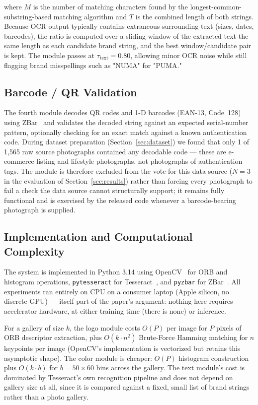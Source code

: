 \documentclass[conference]{IEEEtran}
\begin{document}
where $M$ is the number of matching characters found by the
longest-common-substring-based matching algorithm and $T$ is the combined
length of both strings. Because OCR output typically contains extraneous
surrounding text (sizes, dates, barcodes), the ratio is computed over a
sliding window of the extracted text the same length as each candidate
brand string, and the best window/candidate pair is kept. The module
passes at $\tau_{\text{text}} = 0.80$, allowing minor OCR noise while
still flagging brand misspellings such as "NUMA" for "PUMA."

\subsection{Barcode / QR Validation}
\label{sec:qr}

The fourth module decodes QR codes and 1-D barcodes (EAN-13, Code~128)
using ZBar~\cite{zbar} and validates the decoded string against an
expected serial-number pattern, optionally checking for an exact match
against a known authentication code. During dataset preparation
(Section~\ref{sec:dataset}) we found that only 1 of 1{,}565 raw source
photographs contained any decodable code --- these are e-commerce listing
and lifestyle photographs, not photographs of authentication tags. The
module is therefore excluded from the vote for this data source
($N{=}3$ in the evaluation of Section~\ref{sec:results}) rather than
forcing every photograph to fail a check the data source cannot
structurally support; it remains fully functional and is exercised by the
released code whenever a barcode-bearing photograph is supplied.

\subsection{Implementation and Computational Complexity}
\label{sec:complexity}

The system is implemented in Python 3.14 using OpenCV~\cite{opencv} for
ORB and histogram operations, \texttt{pytesseract} for
Tesseract~\cite{tesseract2007}, and \texttt{pyzbar} for
ZBar~\cite{zbar}. All experiments ran entirely on CPU on a consumer
laptop (Apple silicon, no discrete GPU) --- itself part of the paper's
argument: nothing here requires accelerator hardware, at either training
time (there is none) or inference.

For a gallery of size $k$, the logo module costs $O(P)$ per image for
$P$ pixels of ORB descriptor extraction, plus $O(k \cdot n^2)$ Brute-Force
Hamming matching for $n$ keypoints per image (OpenCV's implementation is
vectorized but retains this asymptotic shape). The color module is
cheaper: $O(P)$ histogram construction plus $O(k \cdot b)$ for $b =
50\times60$ bins across the gallery. The text module's cost is
dominated by Tesseract's own recognition pipeline and does not depend on
gallery size at all, since it is compared against a fixed, small list of
brand strings rather than a photo gallery.
\end{document}

